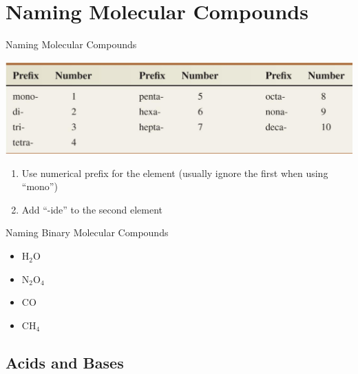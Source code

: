 \documentclass[11pt]{beamer}
\begin{document}
\section{Naming Molecular Compounds}

\begin{frame}{Naming Molecular Compounds}
  \begin{center}
    \includegraphics[width=\linewidth]{prefix_name}
  \end{center}
  
  \begin{enumerate}
  \item Use numerical prefix for the element (usually ignore the first
    when using ``mono'')
  \item Add ``-ide'' to the second element
  \end{enumerate}
\end{frame}

\begin{frame}{Naming Binary Molecular Compounds}
  \begin{itemize}
  \item H$_2$O
  \item N$_2$O$_4$
  \item CO
  \item CH$_4$
  \end{itemize}
\end{frame}

\subsection{Acids and Bases}
\end{document}
